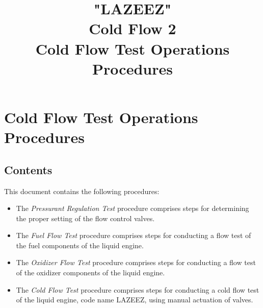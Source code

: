 

\title{
\Huge "LAZEEZ"\\
Cold Flow 2\\
\vspace{1cm}
\Large Cold Flow Test Operations Procedures}





\section{Cold Flow Test Operations Procedures}

\subsection{Contents}
This document contains the following procedures:
\begin{itemize}
    \item The \textit{Pressurant Regulation Test} procedure comprises steps for determining the proper setting of the flow control valves.
    \item The \textit{Fuel Flow Test} procedure comprises steps for conducting a flow test of the fuel components of the liquid engine.
    \item The \textit{Oxidizer Flow Test} procedure comprises steps for conducting a flow test of the oxidizer components of the liquid engine. 
    \item The \textit{Cold Flow Test} procedure comprises steps for conducting a cold flow test of the liquid engine, code name LAZEEZ, using manual actuation of valves. 
\end{itemize}

